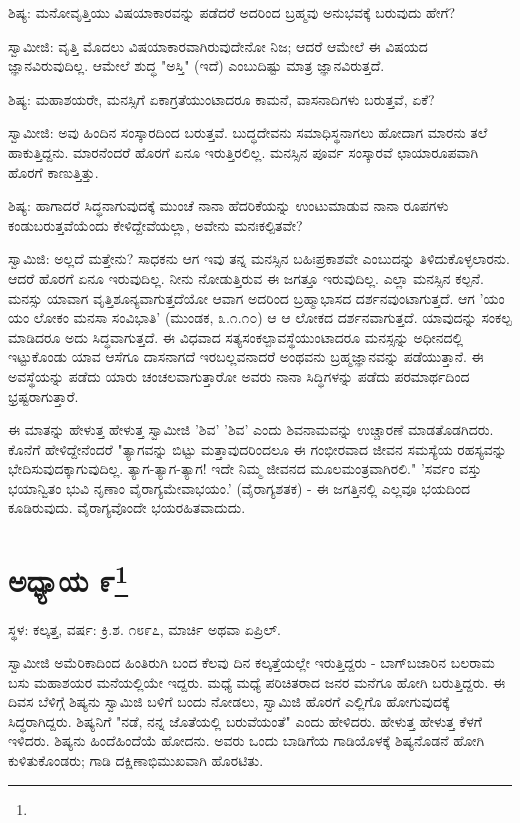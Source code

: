 ಶಿಷ್ಯ: ಮನೋವೃತ್ತಿಯು ವಿಷಯಾಕಾರವನ್ನು ಪಡೆದರೆ ಅದರಿಂದ ಬ್ರಹ್ಮವು ಅನುಭವಕ್ಕೆ ಬರುವುದು ಹೇಗೆ?

ಸ್ವಾಮೀಜಿ: ವೃತ್ತಿ ಮೊದಲು ವಿಷಯಾಕಾರವಾಗಿರುವುದೇನೋ ನಿಜ; ಆದರೆ ಆಮೇಲೆ ಈ ವಿಷಯದ ಜ್ಞಾನವಿರುವುದಿಲ್ಲ. ಆಮೇಲೆ ಶುದ್ಧ "ಅಸ್ತಿ" (ಇದೆ) ಎಂಬುದಿಷ್ಟು ಮಾತ್ರ ಜ್ಞಾನವಿರುತ್ತದೆ.

ಶಿಷ್ಯ: ಮಹಾಶಯರೇ, ಮನಸ್ಸಿಗೆ ಏಕಾಗ್ರತೆಯುಂಟಾದರೂ ಕಾಮನೆ, ವಾಸನಾದಿಗಳು ಬರುತ್ತವೆ, ಏಕೆ?

ಸ್ವಾಮೀಜಿ: ಅವು ಹಿಂದಿನ ಸಂಸ್ಕಾರದಿಂದ ಬರುತ್ತವೆ. ಬುದ್ಧದೇವನು ಸಮಾಧಿಸ್ಥನಾಗಲು ಹೋದಾಗ ಮಾರನು ತಲೆ ಹಾಕುತ್ತಿದ್ದನು. ಮಾರನೆಂದರೆ ಹೊರಗೆ ಏನೂ ಇರುತ್ತಿರಲಿಲ್ಲ. ಮನಸ್ಸಿನ ಪೂರ್ವ ಸಂಸ್ಕಾರವೆ ಛಾಯಾರೂಪವಾಗಿ ಹೊರಗೆ ಕಾಣುತ್ತಿತ್ತು.

ಶಿಷ್ಯ: ಹಾಗಾದರೆ ಸಿದ್ಧನಾಗುವುದಕ್ಕೆ ಮುಂಚೆ ನಾನಾ ಹೆದರಿಕೆಯನ್ನು ಉಂಟುಮಾಡುವ ನಾನಾ ರೂಪಗಳು ಕಂಡುಬರುತ್ತವೆಯೆಂದು ಕೇಳಿದ್ದೇವೆಯಲ್ಲಾ, ಅವೇನು ಮನಃಕಲ್ಪಿತವೇ?

ಸ್ವಾಮಿಜಿ: ಅಲ್ಲದೆ ಮತ್ತೇನು? ಸಾಧಕನು ಆಗ ಇವು ತನ್ನ ಮನಸ್ಸಿನ ಬಹಿಃಪ್ರಕಾಶವೇ ಎಂಬುದನ್ನು ತಿಳಿದುಕೊಳ್ಳಲಾರನು. ಆದರೆ ಹೊರಗೆ ಏನೂ ಇರುವುದಿಲ್ಲ. ನೀನು ನೋಡುತ್ತಿರುವ ಈ ಜಗತ್ತೂ ಇರುವುದಿಲ್ಲ. ಎಲ್ಲಾ ಮನಸ್ಸಿನ ಕಲ್ಪನೆ. ಮನಸ್ಸು ಯಾವಾಗ ವೃತ್ತಿಶೂನ್ಯವಾಗುತ್ತದೆಯೋ ಆವಾಗ ಅದರಿಂದ ಬ್ರಹ್ಮಾಭಾಸದ ದರ್ಶನವುಂಟಾಗುತ್ತದೆ. ಆಗ 'ಯಂ ಯಂ ಲೋಕಂ ಮನಸಾ ಸಂವಿಭಾತಿ' (ಮುಂಡಕ, ೩.೧.೧೦) ಆ ಆ ಲೋಕದ ದರ್ಶನವಾಗುತ್ತದೆ. ಯಾವುದನ್ನು ಸಂಕಲ್ಪ ಮಾಡಿದರೂ ಅದು ಸಿದ್ಧವಾಗುತ್ತದೆ. ಈ ವಿಧವಾದ ಸತ್ಯಸಂಕಲ್ಪಾವಸ್ಥೆಯುಂಟಾದರೂ ಮನಸ್ಸನ್ನು ಅಧೀನದಲ್ಲಿ ಇಟ್ಟುಕೊಂಡು ಯಾವ ಆಸೆಗೂ ದಾಸನಾಗದೆ ಇರಬಲ್ಲವನಾದರೆ ಅಂಥವನು ಬ್ರಹ್ಮಜ್ಞಾನವನ್ನು ಪಡೆಯುತ್ತಾನೆ. ಈ ಅವಸ್ಥೆಯನ್ನು ಪಡೆದು ಯಾರು ಚಂಚಲವಾಗುತ್ತಾರೋ ಅವರು ನಾನಾ ಸಿದ್ಧಿಗಳನ್ನು ಪಡೆದು ಪರಮಾರ್ಥದಿಂದ ಭ್ರಷ್ಟರಾಗುತ್ತಾರೆ.

ಈ ಮಾತನ್ನು ಹೇಳುತ್ತ ಹೇಳುತ್ತ ಸ್ವಾಮೀಜಿ 'ಶಿವ' 'ಶಿವ' ಎಂದು ಶಿವನಾಮವನ್ನು ಉಚ್ಚಾರಣೆ ಮಾಡತೊಡಗಿದರು. ಕೊನೆಗೆ ಹೇಳಿದ್ದೇನೆಂದರೆ "ತ್ಯಾಗವನ್ನು ಬಿಟ್ಟು ಮತ್ತಾವುದರಿಂದಲೂ ಈ ಗಂಭೀರವಾದ ಜೀವನ ಸಮಸ್ಯೆಯ ರಹಸ್ಯವನ್ನು ಭೇದಿಸುವುದಕ್ಕಾಗುವುದಿಲ್ಲ. ತ್ಯಾಗ-ತ್ಯಾಗ-ತ್ಯಾಗ! ಇದೇ ನಿಮ್ಮ ಜೀವನದ ಮೂಲಮಂತ್ರವಾಗಿರಲಿ." 'ಸರ್ವಂ ವಸ್ತು ಭಯಾನ್ವಿತಂ ಭುವಿ ನೃಣಾಂ ವೈರಾಗ್ಯಮೇವಾಭಯಂ.' (ವೈರಾಗ್ಯಶತಕ) - ಈ ಜಗತ್ತಿನಲ್ಲಿ ಎಲ್ಲವೂ ಭಯದಿಂದ ಕೂಡಿರುವುದು. ವೈರಾಗ್ಯವೊಂದೇ ಭಯರಹಿತವಾದುದು.

\newpage

\chapter[ಅಧ್ಯಾಯ ೯]{ಅಧ್ಯಾಯ ೯\protect\footnote{}}

\begin{center}
ಸ್ಥಳ: ಕಲ್ಕತ್ತ, ವರ್ಷ: ಕ್ರಿ.ಶ. ೧೮೯೭, ಮಾರ್ಚಿ ಅಥವಾ ಏಪ್ರಿಲ್.
\end{center}

ಸ್ವಾಮೀಜಿ ಅಮೆರಿಕಾದಿಂದ ಹಿಂತಿರುಗಿ ಬಂದ ಕೆಲವು ದಿನ ಕಲ್ಕತ್ತೆಯಲ್ಲೇ ಇರುತ್ತಿದ್ದರು - ಬಾಗ್‌ಬಜಾರಿನ ಬಲರಾಮ ಬಸು ಮಹಾಶಯರ ಮನೆಯಲ್ಲಿಯೇ ಇದ್ದರು. ಮಧ್ಯೆ ಮಧ್ಯೆ ಪರಿಚಿತರಾದ ಜನರ ಮನೆಗೂ ಹೋಗಿ ಬರುತ್ತಿದ್ದರು. ಈ ದಿವಸ ಬೆಳಿಗ್ಗೆ ಶಿಷ್ಯನು ಸ್ವಾಮಿಜಿ ಬಳಿಗೆ ಬಂದು ನೋಡಲು, ಸ್ವಾಮಿಜಿ ಹೊರಗೆ ಎಲ್ಲಿಗೊ ಹೋಗುವುದಕ್ಕೆ ಸಿದ್ಧರಾಗಿದ್ದರು. ಶಿಷ್ಯನಿಗೆ "ನಡೆ, ನನ್ನ ಜೊತೆಯಲ್ಲಿ ಬರುವೆಯಂತೆ" ಎಂದು ಹೇಳಿದರು. ಹೇಳುತ್ತ ಹೇಳುತ್ತ ಕೆಳಗೆ ಇಳಿದರು. ಶಿಷ್ಯನು ಹಿಂದೆಹಿಂದೆಯೆ ಹೋದನು. ಅವರು ಒಂದು ಬಾಡಿಗೆಯ ಗಾಡಿಯೊಳಕ್ಕೆ ಶಿಷ್ಯನೊಡನೆ ಹೋಗಿ ಕುಳಿತುಕೊಂಡರು; ಗಾಡಿ ದಕ್ಷಿಣಾಭಿಮುಖವಾಗಿ ಹೊರಟಿತು.

